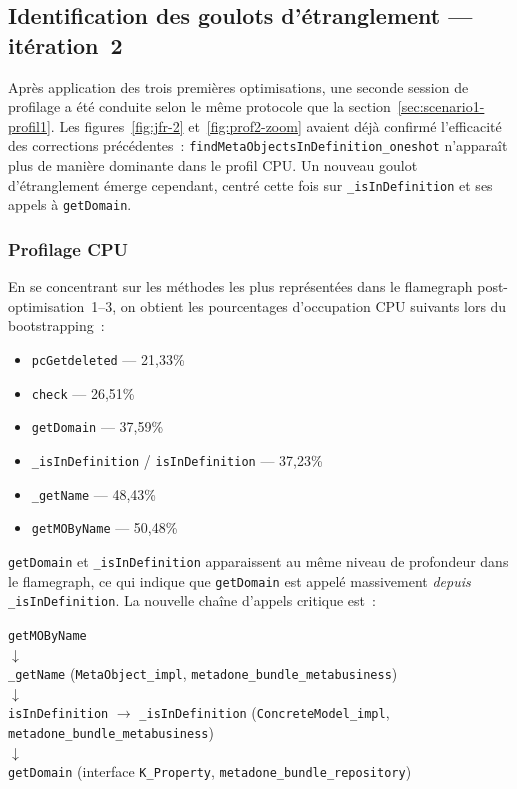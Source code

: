 \subsection{Identification des goulots d'étranglement --- itération~2}
\label{sec:scenario1-profil2}

Après application des trois premières optimisations, une seconde session
de profilage a été conduite selon le même protocole que la
section~\ref{sec:scenario1-profil1}. Les figures~\ref{fig:jfr-2}
et~\ref{fig:prof2-zoom} avaient déjà confirmé l'efficacité des
corrections précédentes~: \texttt{findMetaObjectsInDefinition\_oneshot}
n'apparaît plus de manière dominante dans le profil CPU. Un nouveau
goulot d'étranglement émerge cependant, centré cette fois sur
\texttt{\_isInDefinition} et ses appels à \texttt{getDomain}.

\subsubsection{Profilage CPU}

En se concentrant sur les méthodes les plus représentées dans le
flamegraph post-optimisation~1--3, on obtient les pourcentages d'occupation
CPU suivants lors du bootstrapping~:

\begin{itemize}
    \item \texttt{pcGetdeleted} --- 21,33\%
    \item \texttt{check} --- 26,51\%
    \item \texttt{getDomain} --- 37,59\%
    \item \texttt{\_isInDefinition} / \texttt{isInDefinition} --- 37,23\%
    \item \texttt{\_getName} --- 48,43\%
    \item \texttt{getMOByName} --- 50,48\%
\end{itemize}

\texttt{getDomain} et \texttt{\_isInDefinition} apparaissent au même
niveau de profondeur dans le flamegraph, ce qui indique que
\texttt{getDomain} est appelé massivement \textit{depuis}
\texttt{\_isInDefinition}. La nouvelle chaîne d'appels critique est~:
\begin{center}
\small
\texttt{getMOByName} \\
$\downarrow$ \\
\texttt{\_getName}
(\texttt{MetaObject\_impl},
\texttt{metadone\_bundle\_metabusiness}) \\
$\downarrow$ \\
\texttt{isInDefinition} $\to$ \texttt{\_isInDefinition} 
(\texttt{ConcreteModel\_impl},
\texttt{metadone\_bundle\_metabusiness}) \\
$\downarrow$ \\
\texttt{getDomain} 
(interface \texttt{K\_Property},
\texttt{metadone\_bundle\_repository})
\end{center}

